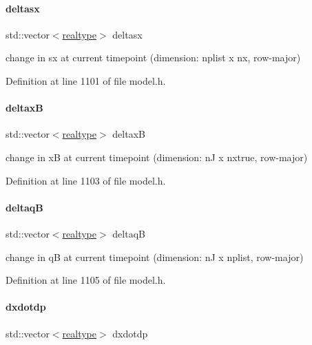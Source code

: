 \paragraph{\texorpdfstring{deltasx}{deltasx}}
{\footnotesize\ttfamily std\+::vector$<$\mbox{\hyperlink{namespaceamici_a1bdce28051d6a53868f7ccbf5f2c14a3}{realtype}}$>$ deltasx}

change in sx at current timepoint (dimension\+: nplist x nx, row-\/major) 

Definition at line 1101 of file model.\+h.

\mbox{\label{classamici_1_1_model_ad849fbfc7f8089c1a98ab6ac5ba96861}} 
\paragraph{\texorpdfstring{deltaxB}{deltaxB}}
{\footnotesize\ttfamily std\+::vector$<$\mbox{\hyperlink{namespaceamici_a1bdce28051d6a53868f7ccbf5f2c14a3}{realtype}}$>$ deltaxB}

change in xB at current timepoint (dimension\+: nJ x nxtrue, row-\/major) 

Definition at line 1103 of file model.\+h.

\mbox{\label{classamici_1_1_model_a1389b2fb29c46c42f7c24b4d5972af7a}} 
\paragraph{\texorpdfstring{deltaqB}{deltaqB}}
{\footnotesize\ttfamily std\+::vector$<$\mbox{\hyperlink{namespaceamici_a1bdce28051d6a53868f7ccbf5f2c14a3}{realtype}}$>$ deltaqB}

change in qB at current timepoint (dimension\+: nJ x nplist, row-\/major) 

Definition at line 1105 of file model.\+h.

\mbox{\label{classamici_1_1_model_adba071f2419937047304600d4dad9b04}} 
\paragraph{\texorpdfstring{dxdotdp}{dxdotdp}}
{\footnotesize\ttfamily std\+::vector$<$\mbox{\hyperlink{namespaceamici_a1bdce28051d6a53868f7ccbf5f2c14a3}{realtype}}$>$ dxdotdp}

